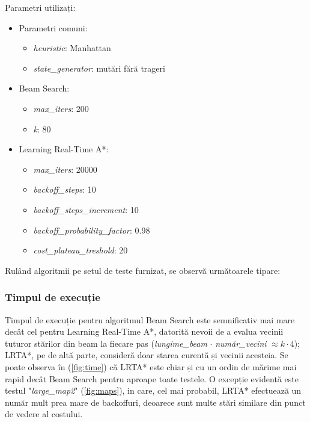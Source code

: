 \documentclass{article}
\begin{document}
Parametri utilizați:
\begin{itemize}
    \item Parametri comuni:
    \begin{itemize}
        \item \textit{heuristic}: Manhattan
        \item \textit{state\_generator}: mutări fără trageri
    \end{itemize}
    \item Beam Search:
    \begin{itemize}
        \item \textit{max\_iters}: 200
        \item \textit{k}: 80
    \end{itemize}
    \item Learning Real-Time A*:
    \begin{itemize}
        \item \textit{max\_iters}: 20000
        \item \textit{backoff\_steps}: 10
        \item \textit{backoff\_steps\_increment}: 10
        \item \textit{backoff\_probability\_factor}: 0.98
        \item \textit{cost\_plateau\_treshold}: 20
    \end{itemize}
\end{itemize}

Rulând algoritmii pe setul de teste furnizat, se observă următoarele tipare:

\subsubsection*{Timpul de execuție}
Timpul de execuție pentru algoritmul Beam Search este semnificativ mai mare
decât cel pentru Learning Real-Time A*, datorită nevoii de a evalua vecinii 
tuturor stărilor din beam la fiecare pas (\textit{lungime\_beam} $\cdot$ 
\textit{număr\_vecini} $\approx k \cdot 4$); LRTA*, pe de altă parte, consideră
doar starea curentă și vecinii acesteia. Se poate observa în (\ref{fig:time}) că
LRTA* este chiar și cu un ordin de mărime mai rapid decât Beam Search pentru 
aproape toate testele. O excepție evidentă este testul "\textit{large\_map2}"
(\ref{fig:maps}), in care, cel mai probabil, LRTA* efectuează un număr 
mult prea mare de backoffuri, deoarece sunt multe stări similare din punct de 
vedere al costului.
\end{document}
